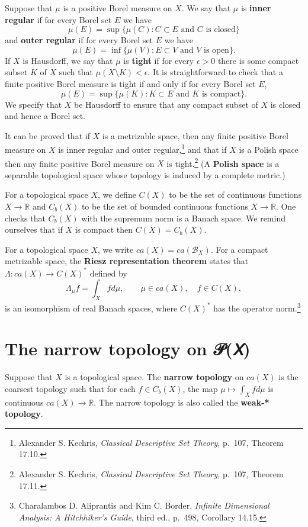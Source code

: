 \documentclass{article}
\theoremstyle{definition}
\theoremstyle{definition}
\begin{document}
Suppose that $\mu$ is a positive Borel measure on $X$. We say that $\mu$
is \textbf{inner regular} if for every Borel set $E$ we have
\[
\mu(E) = \sup\{\mu(C): \textrm{$C \subset E$ and $C$ is closed}\}
\]
and \textbf{outer regular} if for every Borel set $E$ we have
\[
\mu(E) = \inf\{\mu(V): \textrm{$E \subset V$ and $V$ is open}\}.
\]
If $X$ is Hausdorff,
we say that $\mu$ is \textbf{tight} if for every $\epsilon>0$ there is some  compact  subset $K$ of $X$ such that
$\mu(X \setminus K)<\epsilon$. It is straightforward to check that a finite positive Borel measure is tight if and only if for every Borel set $E$,
\[
\mu(E) = \sup\{\mu(K): \textrm{$K \subset E$ and $K$ is compact}\}.
\]
We specify that $X$ be Hausdorff to ensure that any compact subset of $X$ is closed and hence a Borel set. 



It can be proved that if $X$ is a metrizable space, then any finite positive Borel measure on $X$ is 
inner regular and outer regular,\footnote{Alexander S. Kechris, {\em Classical Descriptive Set Theory}, p.~107,
Theorem 17.10.} and that if $X$ is a Polish space then any finite positive Borel measure on $X$ is tight.\footnote{Alexander S. Kechris, {\em Classical Descriptive Set Theory},
p.~107,
Theorem 17.11.} (A \textbf{Polish space} is a separable topological space whose topology is induced by a  complete metric.)

For a topological space $X$, we define 
$C(X)$ to be the set of continuous functions $X \to \mathbb{R}$ and
$C_b(X)$ to be the set of bounded
continuous functions $X \to \mathbb{R}$. One checks that $C_b(X)$ with the supremum norm is a Banach space. We remind ourselves
that if $X$ is compact then $C(X)=C_b(X)$. 

For a topological space $X$, 
we write $ca(X) = ca(\mathscr{B}_X)$.
For a compact metrizable  space, the \textbf{Riesz representation theorem} states that
$\Lambda:ca(X) \to C(X)^*$ defined by
\[
\Lambda_\mu f = \int_X f d\mu, \qquad  \mu \in ca(X), \quad f \in C(X),
\]
is an isomorphism of real Banach spaces, where $C(X)^*$ has the operator norm.\footnote{Charalambos D. 
Aliprantis and Kim C. Border, {\em Infinite Dimensional Analysis: A Hitchhiker's Guide}, third ed., p.~498,
Corollary 14.15.} 


\section{The narrow topology on 𝒫(𝘟)}
Suppose that $X$ is a topological space. The \textbf{narrow topology} on $ca(X)$ is the coarsest topology such that for each
$f \in C_b(X)$, the map $\mu \mapsto \int_X f d\mu$ is continuous $ca(X) \to \mathbb{R}$. The narrow topology is also called
the \textbf{weak-* topology}. 
\end{document}
